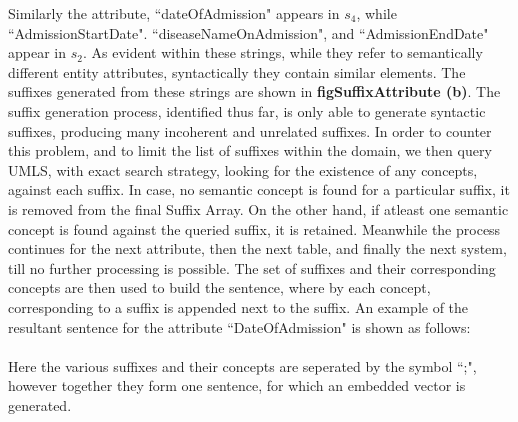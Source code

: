 Similarly the attribute, ``dateOfAdmission" appears in $s_4$, while ``AdmissionStartDate". ``diseaseNameOnAdmission", and ``AdmissionEndDate" appear in $s_2$. As evident within these strings, while they refer to semantically different entity attributes, syntactically they contain similar elements. The suffixes generated from these strings are shown in \textbf{figSuffixAttribute (b)}. The suffix generation process, identified thus far, is only able to generate syntactic suffixes, producing many incoherent and unrelated suffixes. In order to counter this problem, and to limit the list of suffixes within the domain, we then query UMLS, with exact search strategy, looking for the existence of any concepts, against each suffix. In case, no semantic concept is found for a particular suffix, it is removed from the final Suffix Array. On the other hand, if atleast one semantic concept is found against the queried suffix, it is retained. Meanwhile the process continues for the next attribute, then the next table, and finally the next system, till no further processing is possible. 
The set of suffixes and their corresponding concepts are then used to build the sentence, where by each concept, corresponding to a suffix is appended next to the suffix. An example of the resultant sentence for the attribute ``DateOfAdmission" is shown as follows:\\

\\

Here the various suffixes and their concepts are seperated by the symbol ``;", however together they form one sentence, for which an embedded vector is generated. 

